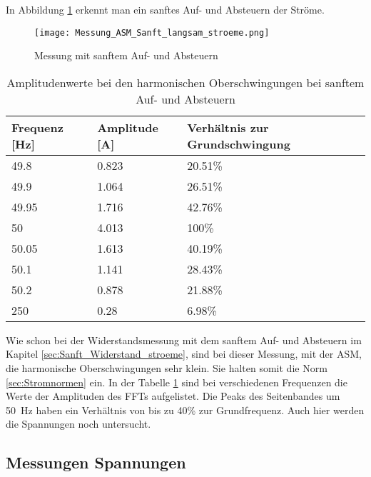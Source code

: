In Abbildung \ref{fig:Mess_Sanft_langsam_stroeme} erkennt man ein sanftes Auf- und Absteuern der Ströme.

\begin{figure}[ht!]
	\centering
	\texttt{[image: Messung\_ASM\_Sanft\_langsam\_stroeme.png]}	
	\caption{Messung mit sanftem Auf- und Absteuern}\label{fig:Mess_Sanft_langsam_stroeme}
\end{figure}

\begin{table}[ht!]
	\centering
	\begin{tabular}{|l|l|l|}
		\hline
		Frequenz {[}Hz{]} & Amplitude {[}A{]} & Verhältnis zur Grundschwingung	\\ \hline
		49.8              & 0.823             & 20.51\%							\\ \hline
		49.9              & 1.064             & 26.51\%							\\ \hline
		49.95             & 1.716             & 42.76\%							\\ \hline
		50                & 4.013             & 100\%							\\ \hline
		50.05             & 1.613             & 40.19\%							\\ \hline
		50.1              & 1.141             & 28.43\%							\\ \hline
		50.2              & 0.878             & 21.88\%							\\ \hline
		250               & 0.28              & 6.98\%							\\ \hline
	\end{tabular}
	\caption{Amplitudenwerte bei den harmonischen Oberschwingungen bei sanftem Auf- und Absteuern}\label{tab:Sanft_langsam_ASM_stroeme}
\end{table}
Wie schon bei der Widerstandsmessung mit dem sanftem Auf- und Absteuern im Kapitel \ref{sec:Sanft_Widerstand_stroeme}, sind bei dieser Messung, mit der ASM, die harmonische Oberschwingungen sehr klein. Sie halten somit die Norm \ref{sec:Stromnormen} ein. In der Tabelle \ref{tab:Sanft_langsam_ASM_stroeme} sind bei verschiedenen Frequenzen die Werte der Amplituden des FFTs aufgelistet.
Die Peaks des Seitenbandes um \SI{50}{Hz} haben ein Verhältnis von bis zu 40\% zur Grundfrequenz. Auch hier werden die Spannungen noch untersucht. 


\newpage
\subsection{Messungen Spannungen}

